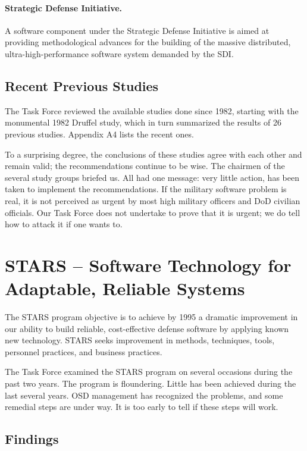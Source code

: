 \documentclass[12pt,final]{article}
\begin{document}
\paragraph{Strategic Defense Initiative.} A software component under the
Strategic Defense Initiative is aimed at providing methodological advances for
the building of the massive distributed, ultra-high-performance software system
demanded by the SDI.

\subsection{Recent Previous Studies}

The Task Force reviewed the available studies done since 1982, starting with
the monumental 1982 Druffel study, which in turn summarized the results of 26
previous studies. Appendix A4 lists the recent ones.

To a surprising degree, the conclusions of these studies agree with each other
and remain valid; the recommendations continue to be wise. The chairmen of the
several study groups briefed us. All had one message: very little action, has
been taken to implement the recommendations. If the military software problem
is real, it is not perceived as urgent by most high military officers and DoD
civilian officials. Our Task Force does not undertake to prove that it is
urgent; we do tell how to attack it if one wants to.

\section{STARS -- Software Technology for Adaptable, Reliable Systems}

The STARS program objective is to achieve by 1995 a dramatic improvement in our
ability to build reliable, cost-effective defense software by applying known
new technology.  STARS seeks improvement in methods, techniques, tools,
personnel practices, and business practices.

The Task Force examined the STARS program on several occasions during the past
two years. The program is floundering. Little has been achieved during the last
several years. OSD management has recognized the problems, and some remedial
steps are under way. It is too early to tell if these steps will work.

\subsection*{Findings}
\end{document}
